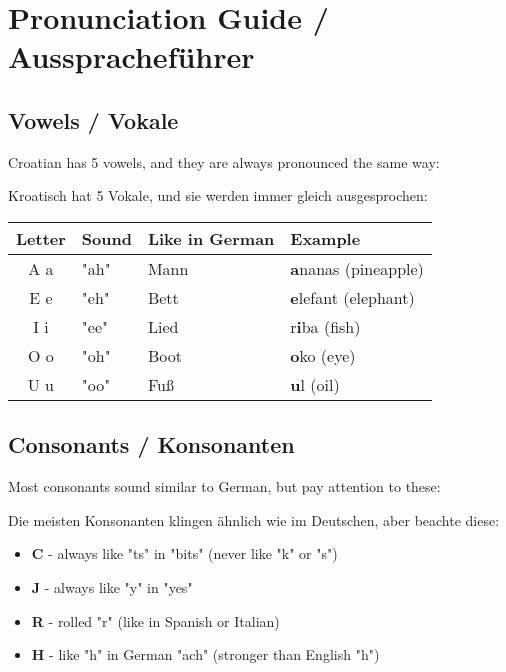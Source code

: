 \section{Pronunciation Guide / Ausspracheführer}

\begin{grammar}
\subsection*{Vowels / Vokale}

Croatian has 5 vowels, and they are always pronounced the same way:

Kroatisch hat 5 Vokale, und sie werden immer gleich ausgesprochen:

\begin{center}
\begin{tabular}{clll}
\toprule
Letter & Sound & Like in German & Example \\
\midrule
A a & "ah" & Mann & \textbf{a}nanas (pineapple) \\
E e & "eh" & Bett & \textbf{e}lefant (elephant) \\
I i & "ee" & Lied & r\textbf{i}ba (fish) \\
O o & "oh" & Boot & \textbf{o}ko (eye) \\
U u & "oo" & Fuß & \textbf{u}l (oil) \\
\bottomrule
\end{tabular}
\end{center}

\subsection*{Consonants / Konsonanten}

Most consonants sound similar to German, but pay attention to these:

Die meisten Konsonanten klingen ähnlich wie im Deutschen, aber beachte diese:

\begin{itemize}
    \item \textbf{C} - always like "ts" in "bits" (never like "k" or "s")
    \item \textbf{J} - always like "y" in "yes"
    \item \textbf{R} - rolled "r" (like in Spanish or Italian)
    \item \textbf{H} - like "h" in German "ach" (stronger than English "h")
\end{itemize}


\end{grammar}
